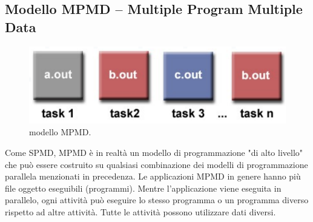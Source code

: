\subsection{Modello MPMD -- Multiple Program Multiple Data} 
\begin{figure}[th]
	\centering
	\includegraphics[width=0.7\linewidth]{img/mpmd}
	\caption{modello MPMD.}
	\label{fig:mpmd}
\end{figure}

Come SPMD, MPMD è in realtà un modello di programmazione "di alto livello" che
può essere costruito su qualsiasi combinazione dei modelli di programmazione parallela menzionati in precedenza.
Le applicazioni MPMD in genere hanno più file oggetto eseguibili
(programmi). Mentre l'applicazione viene eseguita in parallelo, ogni attività
può eseguire lo stesso programma o un programma diverso rispetto ad altre attività.
Tutte le attività possono utilizzare dati diversi.